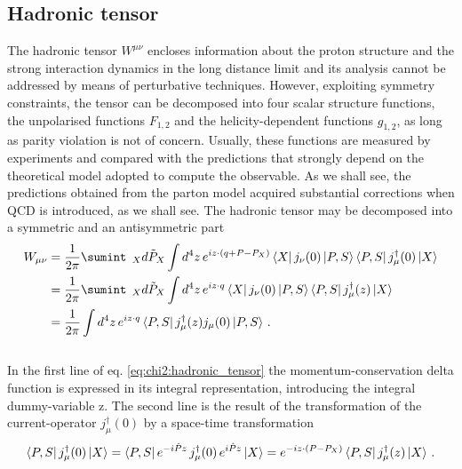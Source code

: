 \subsection*{Hadronic tensor}
The hadronic tensor $W^{\mu \nu}$ encloses information about the proton structure and the strong interaction dynamics in the long distance limit and its analysis cannot be addressed by means of perturbative techniques. However, exploiting symmetry constraints, the tensor can be decomposed into four scalar structure functions, the unpolarised functions $F_{1,2}$ and the helicity-dependent functions $g_{1,2}$, as long as parity violation is not of concern. Usually, these functions are measured by experiments and compared with the predictions that strongly depend on the theoretical model adopted to compute the observable. As we shall see, the predictions obtained from the parton model acquired substantial corrections when QCD is introduced, as we shall see. The hadronic tensor may be decomposed into a symmetric and an antisymmetric part
\\
\begin{equation}
    \begin{split}
        W_{\mu\nu} &= \frac{1}{2\pi} \sumint_{\;\;X} \tilde{d P_X} \int d^4z \, e^{iz \cdot \qty(q + P - P_{X})}\bra{X} j_{\nu}(0) \ket{P,S} \bra{P,S} j^{\dag}_{\mu}(0) \ket{X}\\
        & = \frac{1}{2\pi} \sumint_{\;\;X} \tilde{d P_X} \int d^4z \, e^{iz \cdot q}\bra{X} j_{\nu}(0) \ket{P,S} \bra{P,S} j^{\dag}_{\mu}(z) \ket{X} \\
        & = \frac{1}{2\pi} \int d^4z \, e^{i z \cdot q} \bra{P,S} j^{\dag}_{\mu}(z) j_{\mu}(0) \ket{P,S} \,.
    \end{split}
    \label{eq:ch2:hadronic_tensor}
\end{equation}
\\
In the first line of eq. \eqref{eq:chi2:hadronic_tensor} the momentum-conservation delta function is expressed in its integral representation, introducing the integral dummy-variable z. The second line is the result of the transformation of the current-operator $j^{\dag}_{\mu}(0)$ by a space-time transformation 
\\
\begin{equation}
    \bra{P,S} j^{\dag}_{\mu}(0) \ket{X} =  \bra{P,S} e^{-i\hat{P}z} \, j^{\dag}_{\mu}(0) \, e^{i\hat{P}z} \ket{X} =  e^{-i z \cdot \qty(P - P_X )}\bra{P,S} j^{\dag}_{\mu}(z) \ket{X}\,.
\end{equation}
\\
